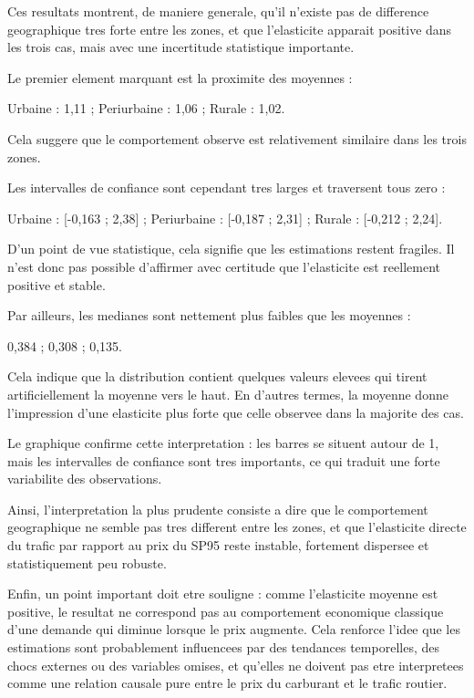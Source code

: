\documentclass[
]{article}
\begin{document}
Ces resultats montrent, de maniere generale, qu'il n'existe pas de
difference geographique tres forte entre les zones, et que l'elasticite
apparait positive dans les trois cas, mais avec une incertitude
statistique importante.

Le premier element marquant est la proximite des moyennes :

Urbaine : 1,11 ; Periurbaine : 1,06 ; Rurale : 1,02.

Cela suggere que le comportement observe est relativement similaire dans
les trois zones.

Les intervalles de confiance sont cependant tres larges et traversent
tous zero :

Urbaine : {[}-0,163 ; 2,38{]} ; Periurbaine : {[}-0,187 ; 2,31{]} ;
Rurale : {[}-0,212 ; 2,24{]}.

D'un point de vue statistique, cela signifie que les estimations restent
fragiles. Il n'est donc pas possible d'affirmer avec certitude que
l'elasticite est reellement positive et stable.

Par ailleurs, les medianes sont nettement plus faibles que les moyennes
:

0,384 ; 0,308 ; 0,135.

Cela indique que la distribution contient quelques valeurs elevees qui
tirent artificiellement la moyenne vers le haut. En d'autres termes, la
moyenne donne l'impression d'une elasticite plus forte que celle
observee dans la majorite des cas.

Le graphique confirme cette interpretation : les barres se situent
autour de 1, mais les intervalles de confiance sont tres importants, ce
qui traduit une forte variabilite des observations.

Ainsi, l'interpretation la plus prudente consiste a dire que le
comportement geographique ne semble pas tres different entre les zones,
et que l'elasticite directe du trafic par rapport au prix du SP95 reste
instable, fortement dispersee et statistiquement peu robuste.

Enfin, un point important doit etre souligne : comme l'elasticite
moyenne est positive, le resultat ne correspond pas au comportement
economique classique d'une demande qui diminue lorsque le prix augmente.
Cela renforce l'idee que les estimations sont probablement influencees
par des tendances temporelles, des chocs externes ou des variables
omises, et qu'elles ne doivent pas etre interpretees comme une relation
causale pure entre le prix du carburant et le trafic routier.
\end{document}
